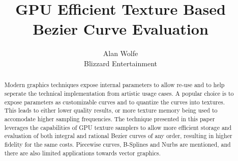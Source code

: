 \documentclass{jcgt}
\begin{document}
\usetikzlibrary{arrows.meta}

\title{GPU Efficient Texture Based Bezier Curve Evaluation}

\author
       {Alan Wolfe\\Blizzard Entertainment}


\maketitle
\thispagestyle{firstpagestyle}

\begin{abstract}
\small
Modern graphics techniques expose internal parameters to allow re-use and to help seperate the technical implementation from artistic usage cases.  A popular choice is to expose parameters as customizable curves and to quantize the curves into textures.  This leads to either lower quality results, or more texture memory being used to accomodate higher sampling frequencies.  The technique presented in this paper leverages the capabilities of GPU texture samplers to allow more efficient storage and evaluation of both integral and rational Bezier curves of any order, resulting in higher fidelity for the same costs.  Piecewise curves, B-Splines and Nurbs are mentioned, and there are also limited applications towards vector graphics.
\end{abstract}
\end{document}
